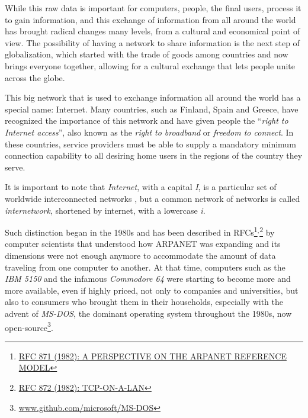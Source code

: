 		While this raw data is important for computers, people, the final users, process it to gain information, and this exchange of information from all around the world has brought radical changes many levels, from a cultural and economical point of view.
		The possibility of having a network to share information is the next step of globalization, which started with the trade of goods among countries and now brings everyone together, allowing for a cultural exchange that lets people unite across the globe.
		
		This big network that is used to exchange information all around the world has a special name: Internet.
		Many countries, such as Finland, Spain and Greece, have recognized the importance of this network and have given people the ``\textit{right to Internet access}'', also known as the \textit{right to broadband} or \textit{freedom to connect}.
		In these countries, service providers must be able to supply a mandatory minimum connection capability to all desiring home users in the regions of the country they serve.
		
		It is important to note that \textit{Internet}, with a capital \textit{I}, is a particular set of worldwide interconnected networks \cite{gg243376}, but a common network of networks is called \textit{internetwork}, shortened by internet, with a lowercase \textit{i}.
		
		Such distinction began in the 1980s and has been described in RFCs\footnote{ \href{datatracker.ietf.org/doc/html/rfc871}{RFC 871 (1982): A PERSPECTIVE ON THE ARPANET REFERENCE MODEL}}$^{,}$\footnote{ \href{datatracker.ietf.org/doc/html/rfc872}{RFC 872 (1982): TCP-ON-A-LAN}} by computer scientists that understood how ARPANET was expanding and its dimensions were not enough anymore to accommodate the amount of data traveling from one computer to another.
		At that time, computers such as the \textit{IBM 5150} and the infamous \textit{Commodore 64} were starting to become more and more available, even if highly priced, not only to companies and universities, but also to consumers who brought them in their households, especially with the advent of \textit{MS-DOS}, the dominant operating system throughout the 1980s, now open-source\footnote{ \url{www.github.com/microsoft/MS-DOS}}.
		
